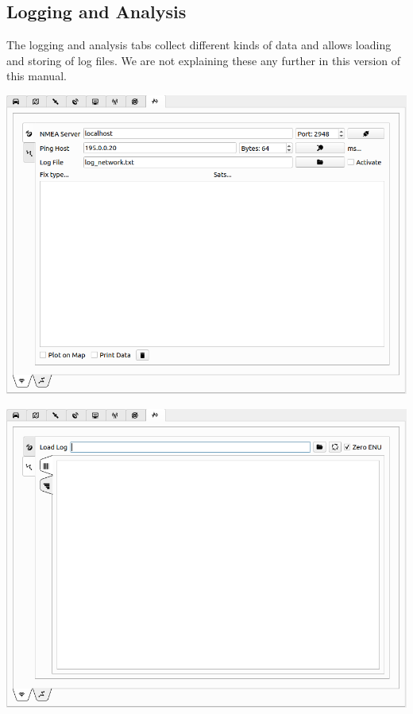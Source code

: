 \documentclass[12pt]{article} %
\begin{document}
\subsection{Logging and Analysis}
The logging and analysis tabs collect different kinds of data and
allows loading and storing of log files. We are not explaining these
any further in this version of this manual.

\noindent\begin{minipage}{0.3\linewidth}
\noindent \includegraphics[width=\textwidth]{./screens/Log1.png}
\end{minipage}
\begin{minipage}{0.3\linewidth}
\noindent \includegraphics[width=\textwidth]{./screens/Log2.png}
\end{minipage}
\end{document}
